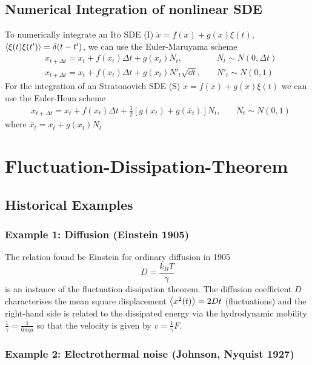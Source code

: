 \documentclass{notebook}
\begin{document}
\section{Numerical Integration of nonlinear SDE}

To numerically integrate an It$\bar{\mathrm{o}}$ SDE (I) $\dot{x} = f(x) + g(x) \xi(t)$, $\expval{\xi(t) \xi(t')} = \delta(t-t')$, we can use the Euler-Maruyama scheme
%
\begin{eqnarray*}
	& x_{t + \Delta t} = x_t + f(x_t) \Delta t + g(x_t) N_t, \quad & N_t \sim N(0, \Delta t) \\
	& x_{t + \Delta t} = x_t + f(x_t) \Delta t + g(x_t) N'_t \sqrt{\dd{t}}, \quad & N'_t \sim N(0, 1)
\end{eqnarray*}
%
For the integration of an Stratonovich SDE (S) $\dot{x} = f(x) + g(x) \xi(t)$ we can use the Euler-Heun scheme
%
\begin{eqnarray*}
	& x_{t + \Delta t} = x_t + f(x_t) \Delta t + \frac{1}{2} [g(x_t) + g(\bar{x}_t)] N_t, \quad & N_t \sim N(0,1) 
\end{eqnarray*}
%
where $\bar{x}_t = x_t + g(x_t) N_t$

\chapter{Fluctuation-Dissipation-Theorem}

\section{Historical Examples}

\subsection*{Example 1: Diffusion (Einstein 1905)}

The relation found be Einstein for ordinary diffusion in 1905
%
\begin{equation}
	D = \frac{k_B T}{\gamma}
\end{equation}
%
is an instance of the fluctuation dissipation theorem. The diffusion coefficient $D$ characterises the mean square displacement $\expval{x^2(t)} = 2 D t$ (fluctuations) and the right-hand side is related to the dissipated energy via the hydrodynamic mobility $\frac{1}{\gamma} = \frac{1}{6 \pi \eta a}$ so that the velocity is given by $v = \frac{1}{\gamma} F$.

\subsection*{Example 2: Electrothermal noise (Johnson, Nyquist 1927)}
\end{document}
